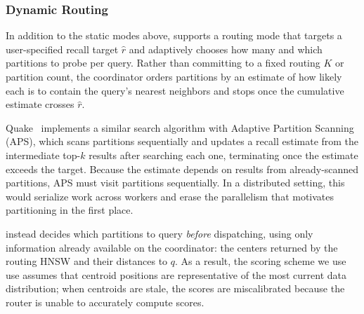 \documentclass[sigconf,review,anonymous]{acmart}
\begin{document}


\subsubsection{Dynamic Routing}
    \label{sec:dynamic-routing}
    In addition to the static modes above, \SystemName{} supports a routing mode that targets a user-specified recall target $\hat{r}$ and adaptively chooses how many and which partitions to probe per query. Rather than committing to a fixed routing $K$ or partition count, the coordinator orders partitions by an estimate of how likely each is to contain the query's nearest neighbors and stops once the cumulative estimate crosses $\hat{r}$.

    Quake~\cite{mohoney2025quake} implements a similar search algorithm with Adaptive Partition Scanning (APS), which scans partitions sequentially and updates a recall estimate from the intermediate top-$k$ results after searching each one, terminating once the estimate exceeds the target. Because the estimate depends on results from already-scanned partitions, APS must visit partitions sequentially. In a distributed setting, this would serialize work across workers and erase the parallelism that motivates partitioning in the first place.

    \SystemName{} instead decides which partitions to query \emph{before} dispatching, using only information already available on the coordinator: the centers returned by the routing HNSW and their distances to $q$. As a result, the scoring scheme we use use assumes that centroid positions are representative of the most current data distribution; when centroids are stale, the scores are miscalibrated because the router is unable to accurately compute scores.
    
\end{document}
